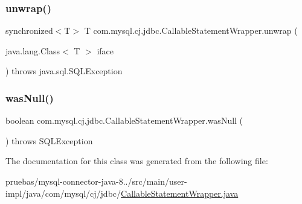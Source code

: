 \subsubsection{\texorpdfstring{unwrap()}{unwrap()}}
{\footnotesize\ttfamily synchronized$<$T$>$ T com.\+mysql.\+cj.\+jdbc.\+Callable\+Statement\+Wrapper.\+unwrap (\begin{DoxyParamCaption}\item[{java.\+lang.\+Class$<$ T $>$}]{iface }\end{DoxyParamCaption}) throws java.\+sql.\+S\+Q\+L\+Exception}

\mbox{\label{classcom_1_1mysql_1_1cj_1_1jdbc_1_1_callable_statement_wrapper_a22610654afb6f387f1b2cec382db2d77}} 
\subsubsection{\texorpdfstring{was\+Null()}{wasNull()}}
{\footnotesize\ttfamily boolean com.\+mysql.\+cj.\+jdbc.\+Callable\+Statement\+Wrapper.\+was\+Null (\begin{DoxyParamCaption}{ }\end{DoxyParamCaption}) throws S\+Q\+L\+Exception}



The documentation for this class was generated from the following file\+:\begin{DoxyCompactItemize}
\item 
pruebas/mysql-\/connector-\/java-\/8../src/main/user-\/impl/java/com/mysql/cj/jdbc/\mbox{\hyperlink{_callable_statement_wrapper_8java}{Callable\+Statement\+Wrapper.\+java}}\end{DoxyCompactItemize}
